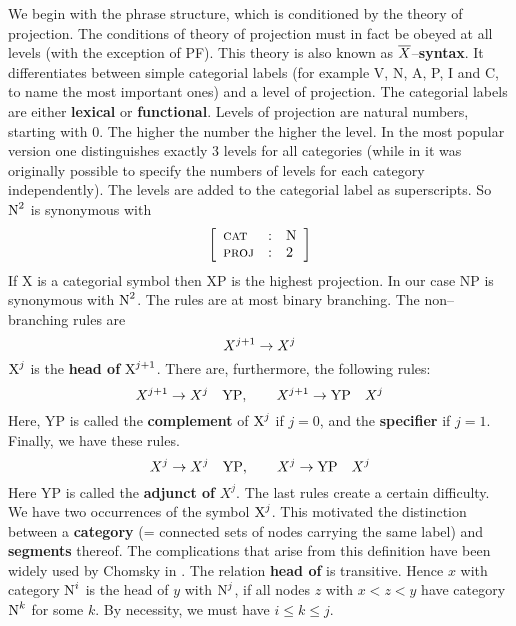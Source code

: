 We begin with the phrase structure, which is conditioned by the
theory of projection. The conditions of theory of projection must
in fact be obeyed at all levels (with the exception of PF).
This theory is also known as
$\overline{X}$--\textbf{syntax}. It differentiates between simple
categorial labels (for example V, N, A, P, I and C, to name the
most important ones) and a level of projection. The categorial
labels are either
\textbf{lexical} or \textbf{functional}. Levels of projection are natural
numbers, starting with 0. The higher the number the higher the level.
In the most popular version one distinguishes exactly 3 levels
for all categories (while in \cite{jackendoff:xbar} it was 
originally possible to specify the numbers of levels for each 
category independently).
The levels are added to the categorial label as superscripts.
So $\mbox{\rm N}^2$ is synonymous with
\begin{equation}
\left[\begin{array}{l@{\quad : \quad}l}
    \mbox{\sc cat} & \mbox{\rm N} \\
    \mbox{\sc proj} & 2
    \end{array}\right]
\end{equation}
If X is a categorial symbol then XP is the highest projection. In
our case NP is synonymous with $\mbox{\rm N}^2$. The rules are at
most binary branching. The non--branching rules are
\begin{equation}
X^{j+1} \rightarrow X^j
\end{equation}
$\mbox{\rm X}^j$ is the \textbf{head of} $\mbox{\rm X}^{j+1}$. There
are, furthermore, the following rules:
\begin{equation}
X^{j+1} \rightarrow X^j\quad \mbox{\rm YP},
\qquad X^{j+1} \rightarrow \mbox{\rm YP}\quad X^j
\end{equation}
Here, {\rm YP} is called the \textbf{complement} of $\mbox{\rm X}^j$
if $j = 0$, and the \textbf{specifier} if $j = 1$.  Finally, we have
these rules.
\begin{equation}
X^j \rightarrow X^j\quad \mbox{\rm YP},
\qquad X^j \rightarrow \mbox{\rm YP}\quad X^j
\end{equation}
Here {\rm YP} is called the \textbf{adjunct of} $X^j$. The last rules
create a certain difficulty. We have two occurrences of the symbol
$\mbox{\rm X}^j$. This motivated the distinction between a
\textbf{category} (= connected sets of nodes carrying the same label)
and \textbf{segments} thereof.
The complications that arise from this definition have been widely
used by Chomsky in . The relation
\textbf{head of} is transitive. Hence $x$ with category $\mbox{\rm N}^i$
is the head of $y$ with $\mbox{\rm N}^j$, if all nodes $z$ with
$x < z < y$ have category $\mbox{\rm N}^k$ for some $k$.
By necessity, we must have $i \leq k \leq j$.

